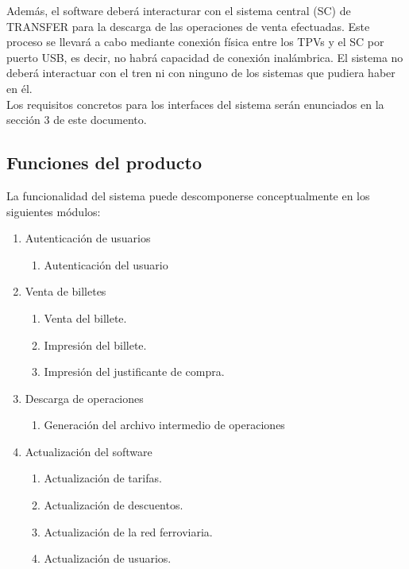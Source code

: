 Además, el software deberá interacturar con el sistema central (SC) de TRANSFER para la descarga de las operaciones de venta efectuadas.  \color{red} Este proceso se llevará a cabo mediante conexión física entre los TPVs y el SC por puerto USB, es decir, no habrá capacidad de conexión inalámbrica. \color{black}
El sistema no deberá interactuar con el tren ni con ninguno de los sistemas que pudiera haber en él.\\

Los requisitos concretos para los interfaces del sistema serán enunciados en la sección 3 de este documento.


\subsection{Funciones del producto}

La funcionalidad del sistema puede descomponerse conceptualmente en los siguientes módulos:

\begin{enumerate}
\item Autenticación de usuarios
	\begin{enumerate}
	\item Autenticación del usuario
	\end{enumerate}
\item Venta de billetes
	\begin{enumerate}
	\item Venta del billete.
	\item Impresión del billete.
	\item Impresión del justificante de compra.
	\end{enumerate}
\item Descarga de operaciones
	\begin{enumerate}
	\item Generación del archivo intermedio de operaciones
	\end{enumerate}
\item Actualización del software
	\begin{enumerate}
	\item Actualización de tarifas.
	\item Actualización de descuentos.
	\item Actualización de la red ferroviaria.
	\item Actualización de usuarios.
	\end{enumerate}
\end{enumerate}

